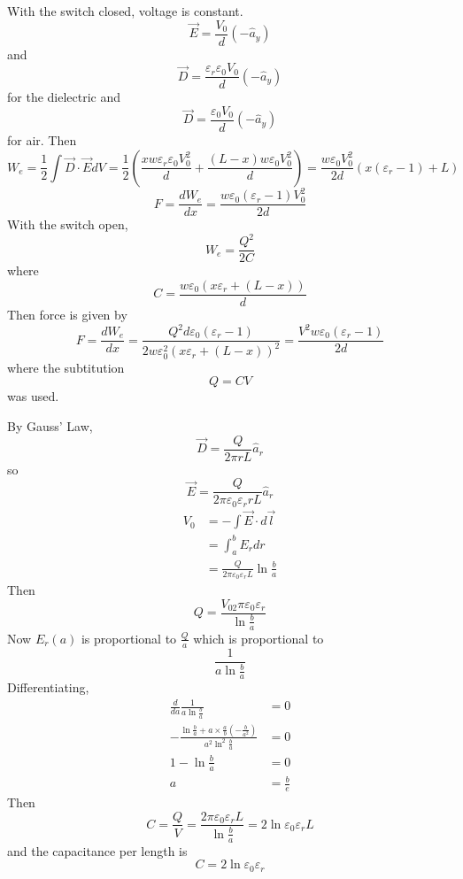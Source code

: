 \documentclass[answers]{exam}
\begin{document}
\begin{questions}
\begin{solution}
	With the switch closed, voltage is constant.
	$$\vec{E} = \frac{V_0}{d}(-\hat{a}_y)$$
	and
	$$\vec{D} = \frac{\varepsilon_r\varepsilon_0V_0}{d}(-\hat{a}_y)$$
	for the dielectric and
	$$\vec{D} = \frac{\varepsilon_0V_0}{d}(-\hat{a}_y)$$
	for air. Then
	$$W_e = \frac{1}{2} \int \vec{D} \cdot \vec{E} dV = \frac{1}{2}\left(\frac{xw\varepsilon_r\varepsilon_0V_0^2}{d} + \frac{(L-x)w\varepsilon_0V_0^2}{d}\right) = \frac{w\varepsilon_0V_0^2}{2d}(x(\varepsilon_r-1)+L)$$
	$$F = \frac{dW_e}{dx} = \frac{w\varepsilon_0(\varepsilon_r-1)V_0^2}{2d}$$
	With the switch open,
	$$W_e = \frac{Q^2}{2C}$$
	where
	$$C = \frac{w\varepsilon_0(x\varepsilon_r+(L-x))}{d}$$
	Then force is given by
	$$F = \frac{dW_e}{dx} = \frac{Q^2d\varepsilon_0(\varepsilon_r-1)}{2w\varepsilon_0^2(x\varepsilon_r+(L-x))^2} = \frac{V^2w\varepsilon_0(\varepsilon_r-1)}{2d}$$
	where the subtitution
	$$Q=CV$$
	was used.
\end{solution}


\begin{solution}
	By Gauss' Law,
	$$\vec{D} = \frac{Q}{2\pi rL}\hat{a}_r$$
	so
	$$\vec{E} = \frac{Q}{2\pi\varepsilon_0\varepsilon_r rL}\hat{a}_r$$
	\begin{align*}
		V_0 &= -\int\vec{E} \cdot d\vec{l} \\
		    &= \int_a^b E_r dr \\
		    &= \frac{Q}{2\pi\varepsilon_0\varepsilon_rL}\ln \frac{b}{a}
	\end{align*}
	Then
	$$Q = \frac{V_02\pi\varepsilon_0\varepsilon_r}{\ln\frac{b}{a}}$$
	Now $E_r(a)$ is proportional to $\frac{Q}{a}$ which is proportional to
	$$\frac{1}{a\ln\frac{b}{a}}$$
	Differentiating,
	\begin{align*}
		\frac{d}{da}\frac{1}{a\ln\frac{b}{a}} &= 0 \\
		-\frac{\ln\frac{b}{a}+a\times\frac{a}{b}\left(-\frac{b}{a^2}\right)}{a^2\ln^2\frac{b}{a}} &= 0 \\
		1-\ln\frac{b}{a} &= 0 \\
		a &= \frac{b}{e}
	\end{align*}
	Then
	$$C = \frac{Q}{V} = \frac{2\pi\varepsilon_0\varepsilon_rL}{\ln\frac{b}{a}} = 2\ln\varepsilon_0\varepsilon_rL$$
	and the capacitance per length is
	$$C = 2\ln\varepsilon_0\varepsilon_r$$
\end{solution}


\end{questions}
\end{document}
